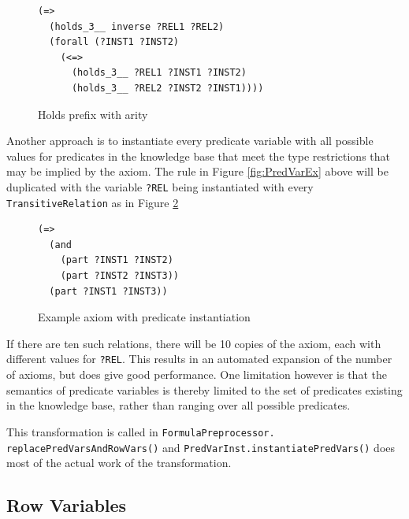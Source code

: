 \documentclass{book}
\begin{document}
\begin{figure}
\begin{framed}
\begin{verbatim}
(=>
  (holds_3__ inverse ?REL1 ?REL2)
  (forall (?INST1 ?INST2)
    (<=>
      (holds_3__ ?REL1 ?INST1 ?INST2)
      (holds_3__ ?REL2 ?INST2 ?INST1))))
\end{verbatim}
\caption{Holds prefix with arity}
\label{fig:HoldsArity}
\end{framed}
\end{figure}

Another approach is to instantiate every predicate variable with all possible
values for predicates in the knowledge base that meet the type restrictions that
may be implied by the axiom.  The rule in Figure \ref{fig:PredVarEx} above will
be duplicated with the variable {\tt ?REL} being instantiated with every {\tt
TransitiveRelation} as in Figure \ref{fig:ExAxPred}
 
\begin{figure}
\begin{framed}
\begin{verbatim}
(=>
  (and
    (part ?INST1 ?INST2)
    (part ?INST2 ?INST3))
  (part ?INST1 ?INST3))
\end{verbatim}
\caption{Example axiom with predicate instantiation}
\label{fig:ExAxPred}
\end{framed}
\end{figure}

If there are ten such relations, there will be 10 copies of the axiom, each with
different values for {\tt ?REL}. This results in an automated expansion of the
number of axioms, but does give good performance.  One limitation however is
that the semantics of predicate variables is thereby
limited to the set of predicates existing in the knowledge base, rather than
ranging over all possible predicates.

\begin{sloppypar}
This transformation is called in \texttt{FormulaPreprocessor. replacePredVarsAndRowVars()}
and \texttt{PredVarInst.instantiatePredVars()} 
does most of the actual work of the
transformation.
\end{sloppypar}

\subsection{Row Variables}
\label{chap:KnowRep:subsec:RowVar}
\end{document}
